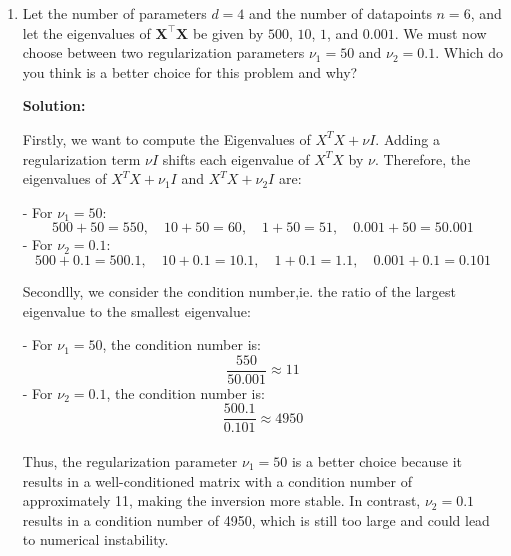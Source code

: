 \documentclass{article}
\newcommand{\mat}[1]{\mathbf{#1}}
\newenvironment{solution}{\color{blue} \smallskip \textbf{Solution:}}{}
\begin{document}
\begin{enumerate}
\begin{solution}
Secondly, we condier the Effect of Regularization on Numerical Stability. When inverting \( X^T X \), small eigenvalues lead to a large condition number and instability. Adding \( \nu I \) ensures that all the eigenvalues are at least \( \nu \), improving the condition number and making the matrix easier to invert. \\

Thus, adding the regularization term \( \nu I \):

- Increases the smallest eigenvalues, improving the condition number.

- Makes the inversion operation more stable, preventing small eigenvalues from dominating.
    \end{solution}

    \newpage
    \item Let the number of parameters $d = 4$ and the number of datapoints $n = 6$, and let the eigenvalues of $\mat{X}^\top \mat{X}$ be given by $500$, $10$, $1$, and $0.001$. We must now choose between two regularization parameters $\nu_1 = 50$ and $\nu_2 = 0.1$. Which do you think is a better choice for this problem and why?
    
    \begin{solution}


Firstly, we want to compute the  Eigenvalues of \( X^T X + \nu I \). Adding a regularization term \( \nu I \) shifts each eigenvalue of \( X^T X \) by \( \nu \). Therefore, the eigenvalues of \( X^T X + \nu_1 I \) and \( X^T X + \nu_2 I \) are:

- For \( \nu_1 = 50 \):
\[
500 + 50 = 550, \quad 10 + 50 = 60, \quad 1 + 50 = 51, \quad 0.001 + 50 = 50.001
\]
- For \( \nu_2 = 0.1 \):
\[
500 + 0.1 = 500.1, \quad 10 + 0.1 = 10.1, \quad 1 + 0.1 = 1.1, \quad 0.001 + 0.1 = 0.101
\]

Secondlly, we consider the condition number,ie. the ratio of the largest eigenvalue to the smallest eigenvalue:

- For \( \nu_1 = 50 \), the condition number is:
\[
\frac{550}{50.001} \approx 11
\]
- For \( \nu_2 = 0.1 \), the condition number is:
\[
\frac{500.1}{0.101} \approx 4950
\]\\

Thus, the regularization parameter \( \nu_1 = 50 \) is a better choice because it results in a well-conditioned matrix with a condition number of approximately 11, making the inversion more stable. In contrast, \( \nu_2 = 0.1 \) results in a condition number of 4950, which is still too large and could lead to numerical instability.




\end{solution}
\end{enumerate}
\end{document}
